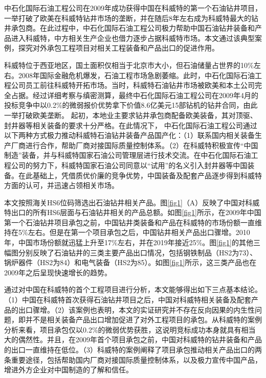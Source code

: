 \documentclass[a4paper,12pt]{article}
\begin{document}
中石化国际石油工程公司在2009年成功获得中国在科威特的第一个石油钻井项目，一举打破了欧美在科威特钻井市场的垄断，并在随后8年左右成为科威特最大的钻井承包商。在此过程中，中石化国际石油工程公司极力帮助中国石油钻井装备和产品进入科威特，中方相关生产企业也借力逐步占据科威特市场。本文通过该典型案例，探究对外承包工程项目对相关工程装备和产品出口的促进作用。

	\vspace{0.5em}  %
	
科威特位于西亚地区，国土面积仅相当于北京市大小，但石油储量占世界的10\%左右。2008年国际金融危机爆发，石油工程市场急剧萎缩。此时，中石化国际石油工程公司员工前往科威特开拓市场。当时，科威特石油钻井市场被欧美和本土公司完全占据。经过详细考察与缜密测算，最终中石化国际石油工程公司在2009年4月的投标竞争中以0.2\%的微弱报价优势拿下价值8.6亿美元15部钻机的钻井合同，由此一举打破欧美垄断。
起初，本地业主要求钻井承包商配备欧美装备，其对顶驱、封井器等相关装备的要求十分严格。在此情况下， 中石化国际石油工程公司通过以下两种方式极力推动科威特石油钻井装备产品国产化：（1）联系国内相关装备生产厂商进行合作，帮助厂商对接国际质量控制体系。（2）在科威特积极宣传“中国制造”装备，并与科威特国家石油公司管理层进行技术交流。在中石化国际石油工程公司的努力下，科威特国家石油公司同意以“试用”的名义引入封井器等中国装备。在此基础上，凭借质优价廉的竞争优势，中国装备及配套产品逐步得到科威特方面的认可，并迅速占领相关市场。

	\vspace{0.5em}  %

本文按照海关HS6位码筛选出石油钻井相关产品。图\ref{fig1}（A）反映了中国对科威特出口的所有HS6层面与石油钻井相关的产品总额。如图\ref{fig1}所示，在2009年中国第一个石油钻井项目承包之前，中国钻井类装备和产品在科威特的市场份额一直维持在5\%左右。但是在第一个项目承包之后，中国钻井相关产品出口骤增。2010年，中国市场份额就迅猛上升至17\%左右，并在2019年接近25\%。图\ref{fig1}的其他三幅图分别反映了石油钻井的三类主要产品出口情况，包括钢铁制品（HS2为73）、锅炉器件（HS2为84）和电气装备（HS2为85）。如图\ref{fig1}所示，这三类产品也在2009年之后呈现快速增长的趋势。

	\vspace{0.5em}  %

通过对中国在科威特的首个工程项目进行分析，本文能够得出如下三点基本结论。（1）中国在科威特首次获得石油钻井项目之后，中国对科威特相关装备及配套产品的出口骤增。（2）该案例也表明，本文的实证研究并不存在反向因果的内生性问题，即并不是相关装备产品出口增加促进了对外工程项目的承包。从科威特的案例分析来看，项目承包仅以0.2\%的微弱优势获胜，这说明竞标成功本身就具有相当大的偶然性。并且，在2009年首个项目承包之前，中国对科威特的钻井装备和产品的出口一直维持在低位。（3）科威特的案例阐释了项目承包推动相关产品出口的两条重要途径，包括帮助国内厂商对接国际质量控制体系，以及极力宣传中国产品，增进外方企业对中国制造的了解和信任。
\end{document}
